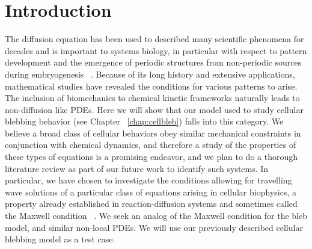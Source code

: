 \section{Introduction}

The diffusion equation has been used to described many scientific phenomena for decades and is important to systems biology, in particular with respect to pattern development and the emergence of periodic structures from non-periodic sources during embryogenesis ~\cite{Kondo2010}. Because of its long history and extensive applications, mathematical studies have revealed the conditions for various patterns to arise. The inclusion of biomechanics to chemical kinetic frameworks naturally leads to non-diffusion like PDEs. Here we will show that our model used to study cellular blebbing behavior (see Chapter ~\ref{chap:cellbleb}) falls into this category. We believe a broad class of cellular behaviors obey similar mechanical constraints in conjunction with chemical dynamics, and therefore a study of the properties of these types of equations is a promising endeavor, and we plan to do a thorough literature review as part of our future work to identify such systems. In particular, we have chosen to investigate the conditions allowing for travelling wave solutions of a particular class of equations arising in cellular biophysics, a property already established in reaction-diffusion systems and sometimes called the Maxwell condition ~\cite{Anonymous:OS1MPwCl,Mori:2008hj}. We seek an analog of the Maxwell condition for the bleb model, and similar non-local PDEs. We will use our previously described cellular blebbing model as a test case.\\








